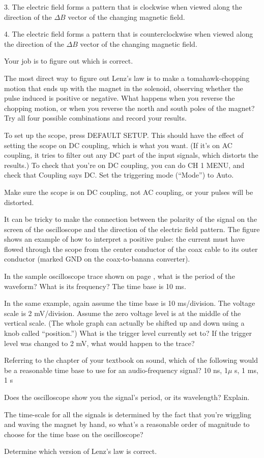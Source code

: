 3. The electric field forms a pattern that is clockwise when
viewed along the direction of the $\Delta B$ vector of the
changing magnetic field.

4. The electric field forms a pattern that is counterclockwise
when viewed along the direction of the $\Delta B$ vector of
the changing magnetic field.

Your job is to figure out which is correct.

The most direct way to figure out Lenz's law is to 
make a tomahawk-chopping motion that ends up with the magnet in the solenoid,
observing whether the pulse induced is positive or negative.
What happens when you reverse the
chopping motion, or when you reverse the north and south
poles of the magnet? Try all four possible combinations and
record your results.

To set up the scope, press DEFAULT SETUP. This should have the
effect of setting the scope on DC coupling, which is what you
want. (If it's on AC coupling, it tries to filter out any DC
part of the input signals, which distorts the results.) To check
that you're on DC coupling, you can do CH 1 MENU, and check that
Coupling says DC. Set the triggering mode (``Mode'') to Auto.

Make sure the scope is on DC coupling, not AC coupling, or your
pulses will be distorted.


It can be tricky to make the connection between the polarity
of the signal on the screen of the oscilloscope and the
direction of the electric field pattern. The figure shows an
example of how to interpret a positive pulse: the current
must have flowed through the scope from the center conductor
of the coax cable to its outer conductor (marked GND on the
coax-to-banana converter). 

\prelab

\prelabquestion  In the sample oscilloscope trace shown on
page \pageref{fig:em-osc-waveform}, what is
the period of the waveform? What is its frequency? The time base is
10 ms.

\prelabquestion  In the same example, again assume the time base is 10
ms/division. The voltage scale is 2 mV/div\-ision. Assume
the zero voltage level is at the middle of the vertical
scale. (The whole graph can actually be shifted up and down
using a knob called ``position.'')  What is the trigger
level currently set to? If the trigger level was changed to
2 mV, what would happen to the trace?

\prelabquestion  Referring to the chapter of your textbook on sound,
which of the following would be a reasonable time base to
use for an audio-frequency signal? 10 ns, 1$\mu$ s, 1 ms, 1 s

\prelabquestion  Does the oscilloscope show you the signal's period,
or its wavelength? Explain.

\prelabquestion The time-scale for all the signals is determined
by the fact that you're wiggling and waving the magnet by hand,
so what's a reasonable order of magnitude to choose for the
time base on the oscilloscope?

\selfcheck

Determine which version of Lenz's law is correct.
